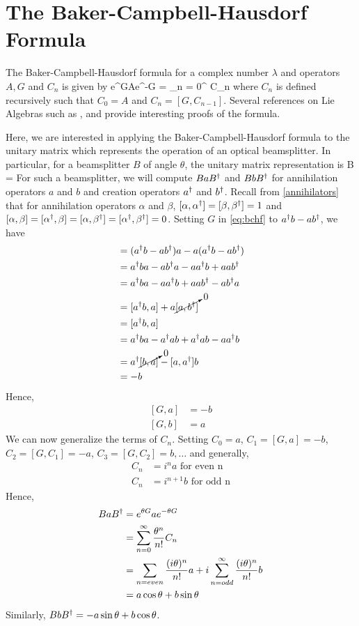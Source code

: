 \chapter{The Baker-Campbell-Hausdorf Formula\label{ch:bchf}}
The Baker-Campbell-Hausdorf formula for a complex number $\lambda$ and operators $A,G$ and $C_n$ is given by
\beq
\label{eq:bchf}
e^{\lambda G}Ae^{-\lambda G} = \sum\limits_{n = 0}^\infty {} C_n
\eeq
where $C_n$ is defined recursively such that $C_0 = A$ and $C_n = [G,C_{n-1}]$. Several references on Lie Algebras such as \cite{liealgs}, \cite{liealgs2} and \cite{liealgs3} provide interesting proofs of the formula.

Here, we are interested in applying the Baker-Campbell-Hausdorf formula to the unitary matrix which represents the operation of an optical beamsplitter. In particular, for a beamsplitter $B$ of angle $\theta$, the unitary matrix representation is
\beq
\label{eq:bseq}
B = 
\eeq
For such a beamsplitter, we will compute $BaB^\dagger$ and $BbB^\dagger$ for annihilation operators $a$ and $b$ and creation operators $a^\dagger$ and $b^\dagger$. Recall from \ref{annihilators} that for annihilation operators $\alpha$ and $\beta$, $[\alpha,\alpha^\dagger] = [\beta,\beta^\dagger] = 1$ and $[\alpha,\beta] = [\alpha^\dagger,\beta] = [\alpha,\beta^\dagger] = [\alpha^\dagger,\beta^\dagger] = 0$. 
Setting $G$ in \eqref{eq:bchf} to $a^\dagger b - ab^\dagger$, we have
\begin{align*}
[G,a] &= (\adj{a} b - a\adj{b})a - a(\adj{a} b - a\adj{b}) \\
&= \adj{a}ba - a\adj{b}a - a\adj{a}b + aa\adj{b}\\
&= \adj{a}ba - a\adj{a}b + aa\adj{b} - a\adj{b}a\\
&= [\adj{a}b,a] + a\cancelto{0}{[a,\adj{b}]}\\
&= [\adj{a}b,a]\\
&= \adj{a}ba - \adj{a}ab + \adj{a}ab - a\adj{a}b\\
&= \adj{a}\cancelto{0}{[b,a]} - [a,\adj{a}]b\\
&= -b
\end{align*}
Hence, 
\begin{align}
\label{eq:Gcommutes}
[G,a] &= -b\\
[G,b] &= a
\end{align}
We can now generalize the terms of $C_n$. Setting $C_0 = a$, $C_1 = [G,a] = -b$, $C_2 = [G,C_1] = -a$, $C_3 = [G,C_2] = b,\ldots$ and generally,
\begin{align*}
C_n &= i^na \text{ for even n}\\
C_n &= i^{n+1}b \text{ for odd n}
\end{align*}
Hence,
\begin{align*}
BaB^\dagger &= e^{\theta G}ae^{-\theta G}\\
&= \sum\limits_{n=0}^\infty \frac{\theta^n}{n!}C_n\\
&= \sum\limits_{n = even} \frac{(i\theta)^n}{n!}a + i\sum\limits_{n = odd}^\infty \frac{(i\theta)^n}{n!}b\\
&= a\cos\theta + b\sin\theta
\end{align*}
Similarly, $BbB^\dagger = -a\sin\theta + b\cos\theta$.

